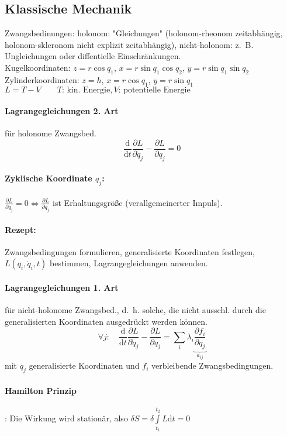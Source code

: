 \documentclass[a4paper, 11pt, fleqn]{article}
\newcommand{\md}{\mathrm{d}}
\newcommand{\pd}[2]{\frac{\partial #1}{\partial #2}}
\newcommand{\ad}[2]{\frac{\md #1}{\md #2}}
\begin{document}
\begin{multicols}{2}
\section{Klassische Mechanik}
Zwangsbedinungen: holonom: "Gleichungen" (holonom-rheonom zeitabhängig, holonom-skleronom nicht explizit zeitabhängig), nicht-holonom: z.~B. Ungleichungen oder diffentielle Einschränkungen.\\
Kugelkoordinaten: $z=r\cos q_1$, $x=r\sin q_1\cos q_2$, $y=r\sin q_1\sin q_2$\\
Zylinderkoordinaten: $z=h$, $x=r\cos q_1$, $y=r\sin q_1$\\
$L=T-V \qquad T\text{: kin. Energie}, V\text{: potentielle Energie}$\\
\paragraph{Lagrangegleichungen 2. Art} für holonome Zwangsbed.
\[\ad{}{t} \pd{L}{\dot q_j} - \pd{L}{q_j}=0\]
\paragraph{Zyklische Koordinate $q_j$:} $\pd{L}{q_j} = 0 \Leftrightarrow \pd{L}{\dot q_j}$ ist Erhaltungsgröße (verallgemeinerter Impuls).
\paragraph{Rezept:} Zwangsbedingungen formulieren, generalisierte Koordinaten festlegen, $L(q_i, \dot q_i, t)$ bestimmen, Lagrangegleichungen anwenden.

\paragraph{Lagrangegleichungen 1. Art} für nicht-holonome Zwangsbed., d.~h. solche, die nicht ausschl. durch die generalisierten Koordinaten ausgedrückt werden können.
\[\forall j: \quad \ad{}{t} \pd{L}{\dot q_j} - \pd{L}{q_j} = \sum\limits_i \lambda_i \underbrace{\pd{f_i}{q_j}}_{a_{ij}}\]
mit $q_j$ generalisierte Koordinaten und $f_i$ verbleibende Zwangsbedingungen.

\paragraph{Hamilton Prinzip}: Die Wirkung wird stationär, also $\delta S = \delta \int\limits_{t_1}^{t_2}L\md t = 0$


\end{multicols}
\end{document}
